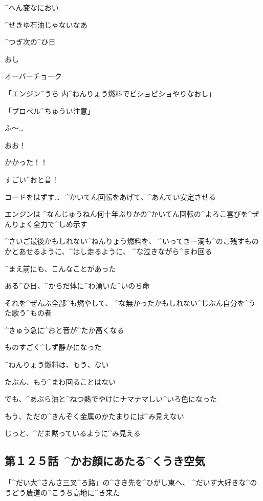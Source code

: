 \Alpha ^{へん}{変}なにおい

\Alpha ^{せきゆ}{石油}じゃないなあ

\page
\Alpha ^{つぎ}{次}の^{ひ}{日}

\Alpha おし

\Alpha オーバーチョーク

\Alpha 「エンジン^{うち }{内}^{ねんりょう}{燃料}でビショビショやりなおし」

\Alpha 「プロペル^{ちゅうい}{注意}」

\Alpha ふ〜…

\page
\Alpha おお！

\Alpha かかった！！

\Alpha すごい^{おと}{音}！

\Alpha コードをはずす…
\ ^{かいてん}{回転}をあげて、^{あんてい}{安定}させる

\page[60]
\Alpha エンジンは
^{なんじゅうねん}{何十年}ぶりかの^{かいてん}{回転}の^{よろこ}{喜}びを^{ぜんりょく}{全力}で^{しめ}{示}す

\Alpha ^{さいご}{最後}かもしれない^{ねんりょう}{燃料}を、
^{いってき}{一滴}も^{のこ}{残}すものかとあせるように、^{はし}{走}るように、
^{な}{泣}きながら^{まわ}{回}る

\page
\Alpha ^{まえ}{前}にも、こんなことがあった

\Alpha ある^{ひ}{日}、^{からだ}{体}に^{わ}{湧}いた^{いのち}{命}

\Alpha それを^{ぜんぶ}{全部}^{も}{燃}やして、
^{な}{無}かったかもしれない^{じぶん}{自分}を^{うた}{歌}う^{もの}{者}

\page[63]
\Alpha ^{きゅう}{急}に^{おと}{音}が^{たか}{高}くなる

\page[65]
\Alpha ものすごく^{しず}{静}かになった

\Alpha ^{ねんりょう}{燃料}は、もう、ない

\Alpha たぶん、もう^{まわ}{回}ることはない

\page
\Alpha でも、^{あぶら}{油}と^{ねつ}{熱}でやけにナマナマしい^{いろ}{色}になった

\Alpha もう、ただの^{きんぞく}{金属}のかたまりには^{み}{見}えない

\Alpha じっと、^{だま}{黙}っているように^{み}{見}える


\subsection{第１２５話\ ^{かお}{顔}にあたる^{くうき}{空気}}

\page[69]
\Alpha 「^{だい}{大}^{さんさ}{三叉}^{ろ}{路}」の^{さき}{先}を^{ひがし}{東}へ、
^{だいす}{大好}きな^{のうどう}{農道}の^{こうち}{高地}に^{き}{来}た

